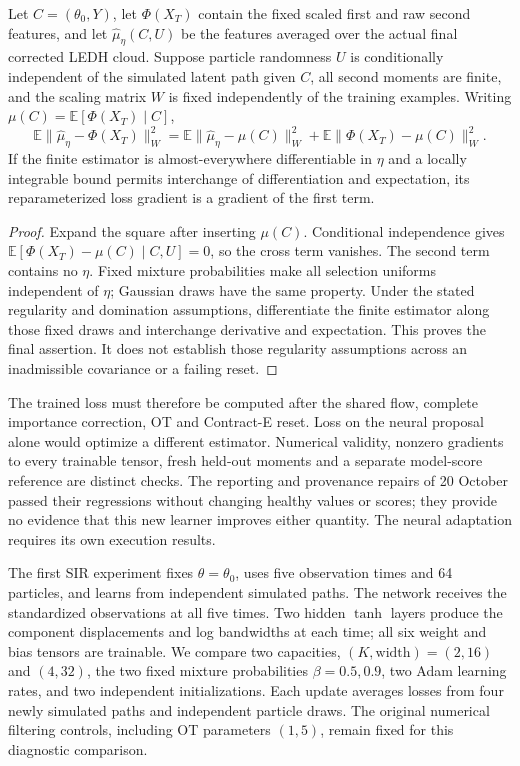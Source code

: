 \begin{proposition}
\label{prop:sir-neural-moment-training}
Let \(C=(\theta_0,Y)\), let \(\Phi(X_T)\) contain the fixed scaled first
and raw second features, and let \(\widehat\mu_\eta(C,U)\) be the features
averaged over the actual final corrected LEDH cloud. Suppose particle
randomness \(U\) is conditionally independent of the simulated latent path
given \(C\), all second moments are finite, and the scaling matrix \(W\)
is fixed independently of the training examples. Writing
\(\mu(C)=\mathbb E[\Phi(X_T)\mid C]\),
\[
 \mathbb E\|\widehat\mu_\eta-\Phi(X_T)\|_W^2
 =\mathbb E\|\widehat\mu_\eta-\mu(C)\|_W^2
  +\mathbb E\|\Phi(X_T)-\mu(C)\|_W^2.
\]
If the finite estimator is almost-everywhere differentiable in \(\eta\)
and a locally integrable bound permits interchange of differentiation and
expectation, its reparameterized loss gradient is a gradient of the first term.
\end{proposition}
\begin{proof}
Expand the square after inserting \(\mu(C)\). Conditional independence gives
\(\mathbb E[\Phi(X_T)-\mu(C)\mid C,U]=0\), so the cross term vanishes.
The second term contains no \(\eta\). Fixed mixture probabilities make all
selection uniforms independent of \(\eta\); Gaussian draws have the same
property. Under the stated regularity and domination assumptions, differentiate
the finite estimator along those fixed draws and interchange derivative and
expectation. This proves the final assertion. It does not establish those
regularity assumptions across an inadmissible covariance or a failing reset.
\end{proof}

The trained loss must therefore be computed after the shared flow, complete
importance correction, OT and Contract-E reset. Loss on the neural proposal
alone would optimize a different estimator. Numerical validity, nonzero
gradients to every trainable tensor, fresh held-out moments and a separate
model-score reference are distinct checks. The reporting and provenance
repairs of 20 October passed their regressions without changing healthy
values or scores; they provide no evidence that this new learner improves
either quantity. The neural adaptation requires its own execution results.

The first SIR experiment fixes \(\theta=\theta_0\), uses five observation
times and 64 particles, and learns from independent simulated paths. The
network receives the standardized observations at all five times. Two hidden
\(\tanh\) layers produce the component displacements and log bandwidths at
each time; all six weight and bias tensors are trainable. We compare two
capacities, \((K,\text{width})=(2,16)\) and \((4,32)\), the two fixed mixture
probabilities \(\beta=0.5,0.9\), two Adam learning rates, and two independent
initializations. Each update averages losses from four newly simulated paths
and independent particle draws. The original numerical filtering controls,
including OT parameters \((1,5)\), remain fixed for this diagnostic comparison.

